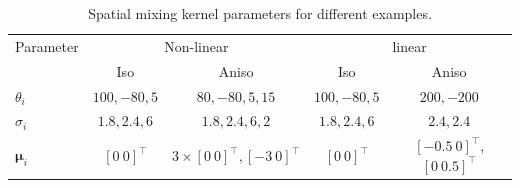 \documentclass[10pt,twocolumn,twoside]{IEEEtran}
\begin{document}
\begin{table}[htbp]
\begin{center}

{\tiny\begin{tabular}{lcccc} 
\hline\hline
\multicolumn{1}{c}{Parameter} & \multicolumn{ 2}{c}{Non-linear} & \multicolumn{ 2}{c}{linear}   \\  \cline{ 1- 5}   
\multicolumn{ 1}{c}{} & Iso & Aniso & Iso & Aniso \vspace{1 mm}\\ 
$\theta_i$ & $100, -80, 5$ & $80, -80, 5, 15$ &$100, -80, 5$&$200, -200$  \\ 
$\sigma_i$ & $1.8, 2.4, 6$ &$1.8, 2.4, 6, 2$ & $1.8, 2.4, 6$ & $2.4, 2.4$ \\ 
$\boldsymbol{\mu}_i$&$[0~0]^{\top}$& $3\times[0~0]^{\top}, [-3~0]^{\top}$ &$[0~0]^{\top}$  &$[-0.5~0]^{\top}$, $[0~0.5]^{\top}$  \vspace{2 mm}\\ \hline \hline
\end{tabular}}
\end{center}
\caption{Spatial mixing kernel parameters for different examples.}
\label{table:KernelParameters}
\end{table}
\end{document}
